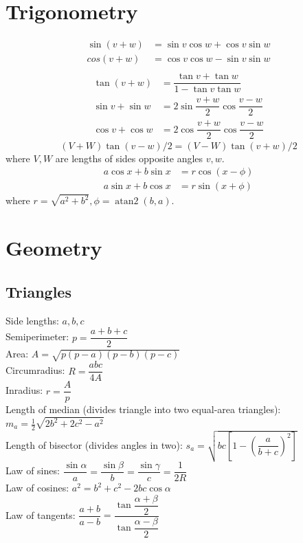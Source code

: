 \documentclass[a4paper]{article}
\begin{document}
\begin{landscape}
\begin{multicols}{2}
\section{Trigonometry}
\begin{align*}
\sin(v+w)&{}=\sin v\cos w+\cos v\sin w\\
cos(v+w)&{}=\cos v\cos w-\sin v\sin w\\
\end{align*}
\begin{align*}
\tan(v+w)&{}=\dfrac{\tan v+\tan w}{1-\tan v\tan w}\\
\sin v+\sin w&{}=2\sin\dfrac{v+w}{2}\cos\dfrac{v-w}{2}\\
\cos v+\cos w&{}=2\cos\dfrac{v+w}{2}\cos\dfrac{v-w}{2}
\end{align*}
\[ (V+W)\tan(v-w)/2{}=(V-W)\tan(v+w)/2 \]
where $V, W$ are lengths of sides opposite angles $v, w$.
\begin{align*}
	a\cos x+b\sin x&=r\cos(x-\phi)\\
	a\sin x+b\cos x&=r\sin(x+\phi)
\end{align*}
where $r=\sqrt{a^2+b^2}, \phi=\operatorname{atan2}(b,a)$.

\section{Geometry}

\subsection{Triangles}
Side lengths: $a,b,c$\\
Semiperimeter: $p=\dfrac{a+b+c}{2}$\\
Area: $A=\sqrt{p(p-a)(p-b)(p-c)}$\\
Circumradius: $R=\dfrac{abc}{4A}$\\
Inradius: $r=\dfrac{A}{p}$\\
Length of median (divides triangle into two equal-area triangles): $m_a=\tfrac{1}{2}\sqrt{2b^2+2c^2-a^2}$\\
Length of bisector (divides angles in two): $s_a=\sqrt{bc\left[1-\left(\dfrac{a}{b+c}\right)^2\right]}$\\
Law of sines: $\dfrac{\sin\alpha}{a}=\dfrac{\sin\beta}{b}=\dfrac{\sin\gamma}{c}=\dfrac{1}{2R}$\\
Law of cosines: $a^2=b^2+c^2-2bc\cos\alpha$\\
Law of tangents: $\dfrac{a+b}{a-b}=\dfrac{\tan\dfrac{\alpha+\beta}{2}}{\tan\dfrac{\alpha-\beta}{2}}$\\


\end{multicols}
\end{landscape}
\end{document}
